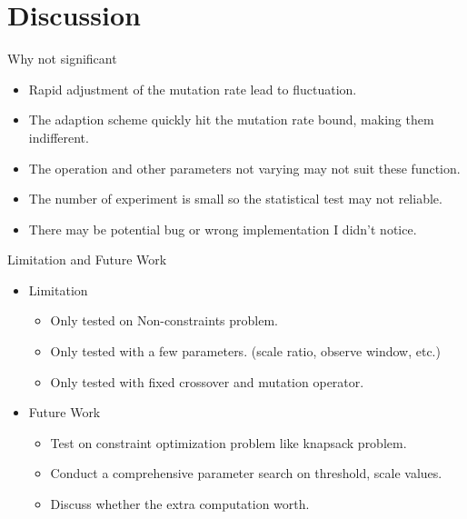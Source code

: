 \section{Discussion}
    
    \frame{\sectionpage}

    \begin{frame}{Why not significant}
        \begin{itemize}
            \item Rapid adjustment of the mutation rate lead to fluctuation.
            \item The adaption scheme quickly hit the mutation rate bound, making them indifferent.
            \item The operation and other parameters not varying may not suit these function.
            \item The number of experiment is small so the statistical test may not reliable.
            \item There may be potential bug or wrong implementation I didn't notice.
        \end{itemize}
    \end{frame}

    \begin{frame}{Limitation and Future Work}
        \begin{itemize}
            \item Limitation
                \begin{itemize}
                    \item Only tested on Non-constraints problem.
                    \item Only tested with a few parameters. (scale ratio, observe window, etc.)
                    \item Only tested with fixed crossover and mutation operator.
                \end{itemize}
            \item Future Work
                \begin{itemize}
                    \item Test on constraint optimization problem like knapsack problem.
                    \item Conduct a comprehensive parameter search on threshold, scale values.
                    \item Discuss whether the extra computation worth.
                \end{itemize}
        \end{itemize}
    \end{frame}
    
        
        
